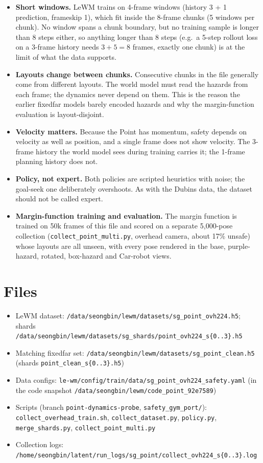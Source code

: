 \documentclass[11pt]{article}
\newcommand{\file}[1]{\nolinkurl{#1}}
\begin{document}
\begin{itemize}
\item \textbf{Short windows.} LeWM trains on 4-frame windows (history 3 + 1 prediction, frameskip 1), which fit inside the 8-frame chunks (5 windows per chunk). No window spans a chunk boundary, but no training sample is longer than 8 steps either, so anything longer than 8 steps (e.g.\ a 5-step rollout loss on a 3-frame history needs $3 + 5 = 8$ frames, exactly one chunk) is at the limit of what the data supports.
\item \textbf{Layouts change between chunks.} Consecutive chunks in the file generally come from different layouts. The world model must read the hazards from each frame; the dynamics never depend on them. This is the reason the earlier fixedfar models barely encoded hazards and why the margin-function evaluation is layout-disjoint.
\item \textbf{Velocity matters.} Because the Point has momentum, safety depends on velocity as well as position, and a single frame does not show velocity. The 3-frame history the world model sees during training carries it; the 1-frame planning history does not.
\item \textbf{Policy, not expert.} Both policies are scripted heuristics with noise; the goal-seek one deliberately overshoots. As with the Dubins data, the dataset should not be called expert.
\item \textbf{Margin-function training and evaluation.} The margin function is trained on 50k frames of this file and scored on a separate 5{,}000-pose collection (\file{collect_point_multi.py}, overhead camera, about 17\% unsafe) whose layouts are all unseen, with every pose rendered in the base, purple-hazard, rotated, box-hazard and Car-robot views.
\end{itemize}

\section{Files}

\begin{itemize}
\item LeWM dataset: \file{/data/seongbin/lewm/datasets/sg_point_ovh224.h5}; shards \file{/data/seongbin/lewm/datasets/sg_shards/point_ovh224_s{0..3}.h5}
\item Matching fixedfar set: \file{/data/seongbin/lewm/datasets/sg_point_clean.h5} (shards \file{point_clean_s{0..3}.h5})
\item Data configs: \file{le-wm/config/train/data/sg_point_ovh224_safety.yaml} (in the code snapshot \file{/data/seongbin/lewm/code_point_92e7589})
\item Scripts (branch \file{point-dynamics-probe}, \file{safety_gym_port/}): \file{collect_overhead_train.sh}, \file{collect_dataset.py}, \file{policy.py}, \file{merge_shards.py}, \file{collect_point_multi.py}
\item Collection logs: \file{/home/seongbin/latent/run_logs/sg_point/collect_ovh224_s{0..3}.log}
\end{itemize}
\end{document}
